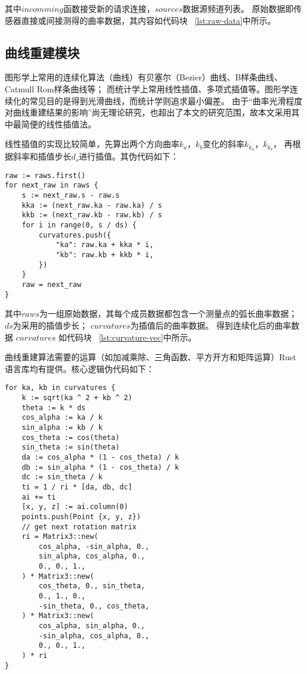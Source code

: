 其中$incomming$函数接受新的请求连接，$sources$数据源频道列表。
原始数据即传感器直接或间接测得的曲率数据，其内容如代码块 ~\ref{lst:raw-data}中所示。

\subsection{曲线重建模块}
图形学上常用的连续化算法（曲线）有贝塞尔（Bezier）曲线、B样条曲线、Catmull Rom样条曲线等；
而统计学上常用线性插值、多项式插值等。图形学连续化的常见目的是得到光滑曲线，而统计学则追求最小偏差。
由于“曲率光滑程度对曲线重建结果的影响”尚无理论研究，也超出了本文的研究范围，故本文采用其中最简便的线性插值法。

线性插值的实现比较简单，先算出两个方向曲率$k_a$，$k_b$变化的斜率$k_{k_a}$，$k_{k_b}$，
再根据斜率和插值步长$d_s$进行插值。其伪代码如下：

\begin{lstlisting}[caption={线性插值法}]
raw := raws.first()
for next_raw in raws {
    s := next_raw.s - raw.s
    kka := (next_raw.ka - raw.ka) / s
    kkb := (next_raw.kb - raw.kb) / s
    for i in range(0, s / ds) {
        curvatures.push({
            "ka": raw.ka + kka * i, 
            "kb": raw.kb + kkb * i,
        })
    }
    raw = next_raw
}
\end{lstlisting}

其中$raws$为一组原始数据，其每个成员数据都包含一个测量点的弧长曲率数据；
$ds$为采用的插值步长；
$curvatures$为插值后的曲率数据。
得到连续化后的曲率数据 $curvatures$ 如代码块 ~\ref{lst:curvature-vec}中所示。

曲线重建算法需要的运算（如加减乘除、三角函数、平方开方和矩阵运算）Rust语言库均有提供。核心逻辑伪代码如下：

\begin{lstlisting}[caption={曲线重建}]
for ka, kb in curvatures {
    k := sqrt(ka ^ 2 + kb ^ 2)
    theta := k * ds
    cos_alpha := ka / k
    sin_alpha := kb / k
    cos_theta := cos(theta)
    sin_theta := sin(theta)
    da := cos_alpha * (1 - cos_theta) / k
    db := sin_alpha * (1 - cos_theta) / k
    dc := sin_theta / k
    ti = 1 / ri * [da, db, dc]
    ai += ti
    [x, y, z] := ai.column(0)
    points.push(Point {x, y, z})
    // get next rotation matrix
    ri = Matrix3::new(
        cos_alpha, -sin_alpha, 0.,
        sin_alpha, cos_alpha, 0.,
        0., 0., 1.,
    ) * Matrix3::new(
        cos_theta, 0., sin_theta,
        0., 1., 0.,
        -sin_theta, 0., cos_theta,
    ) * Matrix3::new(
        cos_alpha, sin_alpha, 0.,
        -sin_alpha, cos_alpha, 0.,
        0., 0., 1.,
    ) * ri
}
\end{lstlisting}

